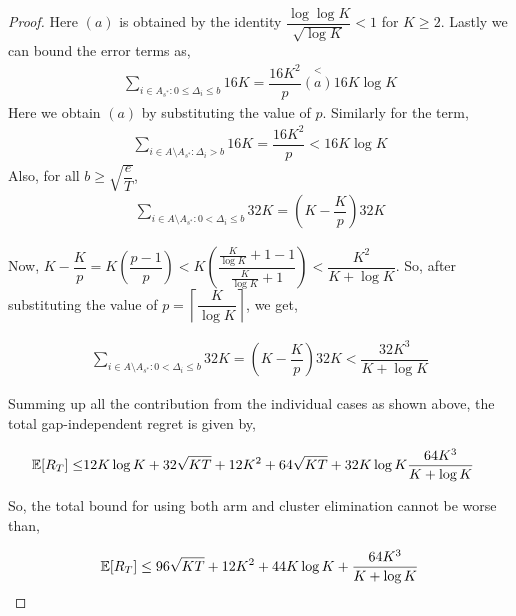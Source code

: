 \begin{proof}
	Here $(a)$ is obtained by the identity $\dfrac{\log\log K}{\sqrt{\log K}} < 1$ for $K\geq 2$. Lastly we can bound the error terms as, 
	\begin{align*}
	\sum\limits_{i\in A_{s^{*}}:0\leq\Delta_{i}\leq b} 16K =\dfrac{16K^2}{p} \overset{<}{(a)} 16K\log K
	\end{align*}	 	
 	Here we obtain $(a)$ by substituting the value of $p$. Similarly for the term,
 	\begin{align*}
 	\sum_{i\in A\setminus A_{s^*}: \Delta_{i} > b} 16K =\dfrac{16K^2}{p} < 16K\log K
	\end{align*} 	
	Also, for all $b\geq \sqrt{\dfrac{e}{T}}$,
	\begin{align*}
 	\sum_{i\in A\setminus A_{s^*}: 0 < \Delta_{i} \leq b} 32K = \left(K-\dfrac{K}{p}\right) 32K
	\end{align*} 	
	
	Now, $K-\dfrac{K}{p}= K\left( \dfrac{p-1}{p} \right) < K\left(  \dfrac{\frac{K}{\log K}+1-1}{\frac{K}{\log K}+1 }\right) < \dfrac{K^2}{K+\log K}$. So, after substituting the value of $p=\left\lceil \dfrac{K}{\log K} \right\rceil$, we get,
	
	\begin{align*}
 	\sum_{i\in A\setminus A_{s^*}: 0 < \Delta_{i} \leq b} 32K = \left(K-\dfrac{K}{p}\right)32K < \dfrac{32 K^3}{K+\log K}
	\end{align*} 	
	
	Summing up all the contribution from the individual cases as shown above, the total gap-independent regret is given by,	
	
	\begin{align*}
	\mathbb{E}[R_{T}]\leq & 12K\log K + 32\sqrt{KT} + 12K^2 + 64\sqrt{KT} + 32K\log K  \dfrac{64 K^3}{K+\log K}
	\end{align*}
 	
	So, the total bound for using both arm and cluster elimination cannot be worse than,
	
	\begin{align*}
	\mathbb{E}[R_{T}]\leq 96\sqrt{KT} + 12K^2 + 44K\log K + \dfrac{64 K^3}{K+\log K}\\ 
	\end{align*}		
\end{proof}

